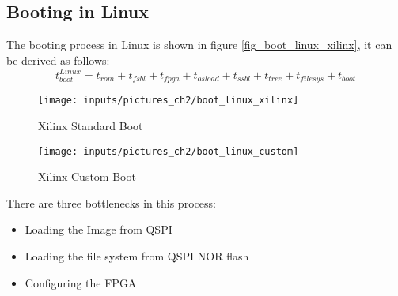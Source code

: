 \subsection{Booting in Linux}\label{ss_booting_in_linux}
The booting process in Linux is shown in figure \ref{fig_boot_linux_xilinx}, it can be derived as follows:
\begin{equation}
t_{boot}^{Linux} = t_{rom} + t_{fsbl} +  t_{fpga} + t_{osload} +  t_{ssbl} + t_{tree} + t_{filesys} + t_{boot}
\label{eq_t_boot_linux} 
\end{equation}

\begin{figure}[htb]
	\begin{center}
	\begin{minipage}[bth]{6,8cm}
		\begin{center}
			\texttt{[image: inputs/pictures\_ch2/boot\_linux\_xilinx]}
			\caption[Xilinx Standard Boot]{Xilinx Standard Boot \cite{xilinx:zbff}}
		\end{center}	
	\end{minipage}\label{fig_boot_linux_xilinx}
	\hspace{0,5cm}
	\begin{minipage}[bth]{6,8cm}
		\begin{center}
			\texttt{[image: inputs/pictures\_ch2/boot\_linux\_custom]}
			\caption[Xilinx Standard Boot]{Xilinx Custom Boot \cite{xilinx:zbff}} 
		\end{center}
	\end{minipage}\label{fig_boot_linux_custom}
	\end{center}
\end{figure}

There are three bottlenecks in this process:
\begin{itemize}
	\item Loading the Image from \ac{QSPI}
	\item Loading the file system from \ac{QSPI} NOR flash
	\item Configuring the \ac{FPGA}
\end{itemize}

